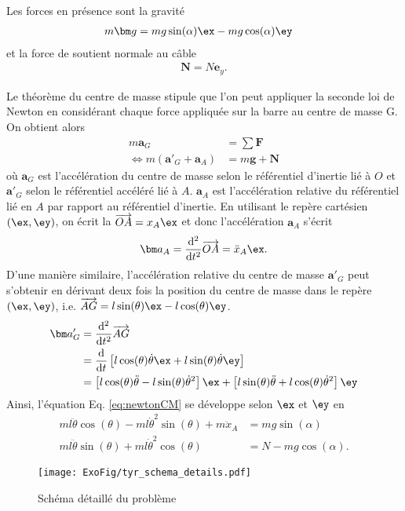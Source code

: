 \par\vspace{2mm}
Les forces en présence sont la gravité
\begin{align}
    m\bm g &= mg\sin(\alpha) \ex - mg\cos(\alpha) \ey
\end{align}
et la force de soutient normale au câble
\begin{align}
    \bm N  = N \bm e_y.
\end{align}

Le théorème du centre de masse stipule que l'on peut appliquer la seconde loi de Newton en considérant chaque force appliquée sur la barre au centre de masse G.
On obtient alors 
\begin{align}
    m \bm a_G &= \sum \bm F \nonumber\\
    \Leftrightarrow m (\bm a'_G + \bm a_A) &= m\bm g + \bm N \label{eq:newtonCM}
\end{align}
o\`u $\bm a_G$ est l'accélération du centre de masse selon le référentiel d'inertie lié à $O$ et $\bm a'_G$ selon le référentiel accéléré lié à $A$. $\bm a_A$ est l'accélération relative du référentiel lié en $A$ par rapport au référentiel d'inertie.
En utilisant le repère cartésien $(\ex,\ey)$, on écrit la $\overrightarrow{OA}=x_A \ex$ et donc l'accélération $\bm a_A$ s'écrit
\begin{equation}
    \bm a_A = \frac{\mathrm d^2}{\mathrm dt^2}\overrightarrow{OA}= \ddot x_A \ex.
\end{equation}
D'une manière similaire, l'accélération relative du centre de masse $\bm a'_G$ peut s'obtenir en dérivant deux fois la position du centre de masse dans le repère $(\ex,\ey)$, i.e. $\overrightarrow{AG}=l\sin(\theta)\ex-l\cos(\theta)\ey$.
\begin{align}
    \bm a'_G &= \frac{\mathrm d^2}{\mathrm dt^2}\overrightarrow{AG}\nonumber\\
    &= \frac{\mathrm d}{\mathrm dt}\left[l\cos(\theta)\dot\theta \ex + l\sin(\theta)\dot\theta \ey \right]\nonumber\\
    &= \left[l\cos(\theta)\ddot\theta  - l\sin(\theta)\dot\theta^2 \right]\ex +  \left[l\sin(\theta)\ddot\theta + l\cos(\theta)\dot\theta^2\right]\ey
\end{align}
Ainsi, l'équation Eq. \eqref{eq:newtonCM} se développe selon $\ex$ et $\ey$ en
\begin{align}
ml\ddot\theta\cos(\theta) - ml\dot\theta^2 \sin(\theta)  + m\ddot x_A &= m g \sin(\alpha)\label{eq:newton_ex}\\
ml\ddot\theta\sin(\theta) +ml \dot\theta^2\cos(\theta) &= N - mg\cos(\alpha) \label{eq:newton_ey}.
\end{align}

 \begin{figure}
     \centering
     \texttt{[image: ExoFig/tyr\_schema\_details.pdf]}
     \caption{Schéma détaillé du problème}
     \label{fig:schema_details}
 \end{figure}
